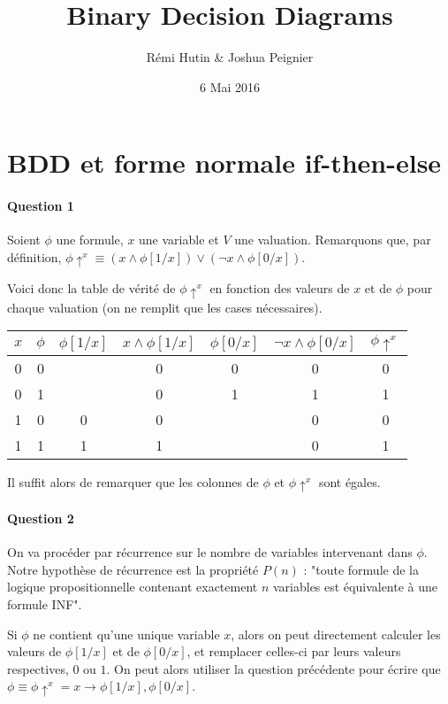 \documentclass[a4paper,11pt]{article}
\title{Binary Decision Diagrams}
\author{Rémi Hutin \& Joshua Peignier}
\date{6 Mai 2016}
\begin{document}
\maketitle

	
	\section{BDD et forme normale if-then-else}

		\paragraph{Question 1}
		Soient $\phi$ une formule, $x$ une variable et $V$ une valuation.\newline
		Remarquons que, par définition, $\phi\uparrow^{x} \equiv (x \wedge \phi[1/x]) \vee (\neg x \wedge \phi[0/x])$.
		
		Voici donc la table de vérité de $\phi\uparrow^{x}$ en fonction des valeurs de $x$ et de $\phi$ pour chaque valuation (on ne remplit que les cases nécessaires).\newline
		
		\begin{tabular}{|c|c|c|c|c|c|c|}
		\hline
		$x$ & $\phi$ & $\phi[1/x]$ &  $x \wedge \phi[1/x]$ & $\phi[0/x]$ & $\neg x \wedge \phi[0/x]$ & $\phi\uparrow^{x}$ \\
		\hline
		0 & 0 &   & 0 & 0 & 0 & 0 \\
		\hline
		0 & 1 &   & 0 & 1 & 1 & 1 \\
		\hline
		1 & 0 & 0 & 0 &   & 0 & 0 \\
		\hline
		1 & 1 & 1 & 1 &   & 0 & 1 \\
		\hline
		\end{tabular}
		
		Il suffit alors de remarquer que les colonnes de $\phi$ et $\phi\uparrow^{x}$ sont égales.
		
		\paragraph{Question 2}
		On va procéder par récurrence sur le nombre de variables intervenant dans $\phi$. Notre hypothèse de récurrence est la propriété $P(n)$ : "toute formule de la logique propositionnelle contenant exactement $n$ variables est équivalente à une formule INF".
	
		Si $\phi$ ne contient qu'une unique variable $x$, alors on peut directement calculer les valeurs de $\phi[1/x]$ et de $\phi[0/x]$, et remplacer celles-ci par leurs valeurs respectives, $0$ ou $1$.
		On peut alors utiliser la question précédente pour écrire que $\phi \equiv \phi\uparrow^{x} = x \rightarrow \phi[1/x],\phi[0/x]$.
		
\end{document}
